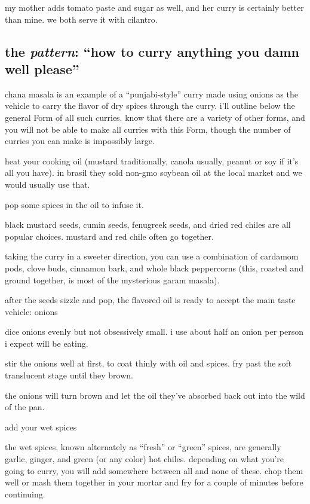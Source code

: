 my mother adds tomato paste and sugar as well, and her curry is certainly 
better than mine. we both serve it with cilantro.

\subsection{the \textit{pattern}: ``how to curry anything you damn well please''}

chana masala is an example of a ``punjabi-style'' curry made using onions as 
the vehicle to carry the flavor of dry spices through the curry. i'll outline 
below the general Form of all such curries. know that there are a variety of 
other forms, and you will not be able to make all curries with this Form, 
though the number of curries you can make is impossibly large.

\begin{algorithm}
  \item heat your cooking oil (mustard traditionally, canola usually, peanut or 
  soy if it's all you have). in brasil they sold non-gmo soybean oil at the 
  local market and we would usually use that.

  \item pop some spices in the oil to infuse it.
  
  black mustard seeds, cumin seeds, fenugreek seeds, and dried red chiles are 
  all popular choices. mustard and red chile often go together.

  taking the curry in a sweeter direction, you can use a combination of 
  cardamom pods, clove buds, cinnamon bark, and whole black peppercorns (this, 
  roasted and ground together, is most of the mysterious garam masala).

  \item after the seeds sizzle and pop, the flavored oil is ready to accept the 
  main taste vehicle: onions
  
  dice onions evenly but not obsessively small. i use about half an onion per 
  person i expect will be eating.

  stir the onions well at first, to coat thinly with oil and spices. fry past 
  the soft translucent stage until they brown.

  the onions will turn brown and let the oil they've absorbed back out into the 
  wild of the pan.

  \item add your wet spices 

  the wet spices, known alternately as ``fresh'' or ``green'' spices, are 
  generally garlic, ginger, and green (or any color) hot chiles. depending on 
  what you're going to curry, you will add somewhere between all and none of 
  these. chop them well or mash them together in your mortar and fry for a 
  couple of minutes before continuing.


\end{algorithm}
